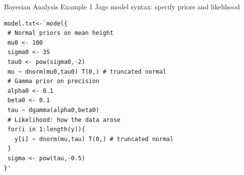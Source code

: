 \documentclass[presentation,9pt,xcolor=dvipsnames]{beamer}
\begin{document}
\begin{frame}[fragile,label={sec:orgef695cd}]{Bayesian Analysis Example 1}
 Jags model syntax: specify priors and likelihood \\
\begin{verbatim}
model.txt<-`model{
 # Normal priors on mean height
 mu0 <- 100 
 sigma0 <- 35
 tau0 <- pow(sigma0,-2)
 mu ~ dnorm(mu0,tau0) T(0,) # truncated normal
 # Gamma prior on precision
 alpha0 <- 0.1
 beta0 <- 0.1
 tau ~ dgamma(alpha0,beta0)
 # Likelihood: how the data arose
 for(i in 1:length(y)){
   y[i] ~ dnorm(mu,tau) T(0,) # truncated normal
 }
 sigma <- pow(tau,-0.5)
}'
\end{verbatim}
\end{frame}
\end{document}
